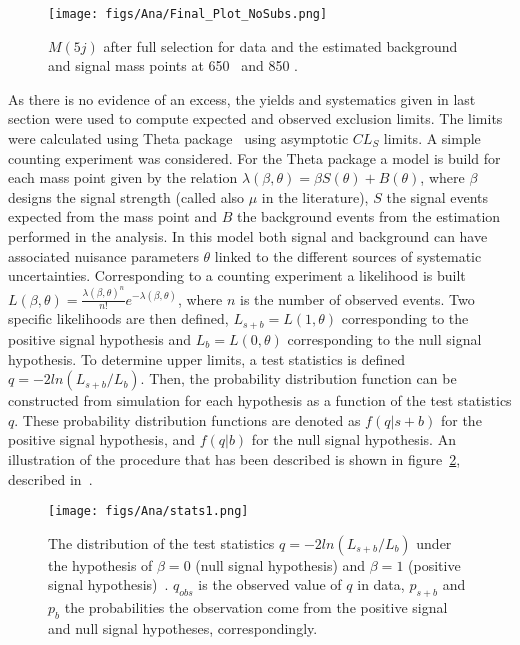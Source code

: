 \begin{figure}[!Hhtbp]
  \begin{center}
    \texttt{[image: figs/Ana/Final\_Plot\_NoSubs.png]}
    \caption{$M(5j)$ after full selection for data and the estimated background and signal mass points at 650 \GeVcc~and 850 \GeVcc.}
    \label{fig:FinalPlot2}
  \end{center}
\end{figure}

As there is no evidence of an excess, the yields and systematics given in last section were used to compute expected and observed exclusion limits. The limits were calculated using Theta package~\cite{theta_web} using asymptotic $CL_{S}$ limits. A simple counting experiment was considered. For the Theta package a model is build for each mass point given by the relation ${\lambda(\beta,\theta)=\beta S(\theta)+B(\theta)}$, where $\beta$ designs the signal strength (called also $\mu$ in the literature), $S$ the signal events expected from the mass point and $B$ the background events from the estimation performed in the analysis. In this model both signal and background can have associated nuisance parameters $\theta$ linked to the different sources of systematic uncertainties. Corresponding to a counting experiment a likelihood is built $L(\beta,\theta)=\frac{\lambda(\beta,\theta)^{n}}{n!}e^{-\lambda(\beta,\theta)}$, where $n$ is the number of observed events. Two specific likelihoods are then defined, $L_{s+b}=L(1,\theta)$ corresponding to the positive signal hypothesis and $L_{b}=L(0,\theta)$ corresponding to the null signal hypothesis. To determine upper limits, a test statistics is defined $q=-2ln(L_{s+b}/L_{b})$. Then, the probability distribution function can be constructed from simulation for each hypothesis as a function of the test statistics $q$. These probability distribution functions are denoted as $f(q|s+b)$ for the positive signal hypothesis, and $f(q|b)$ for the null signal hypothesis. An illustration of the procedure that has been described is shown in figure~\ref{fig:stats1}, described in~\cite{stats1}. 

\begin{figure}[!Hhtbp]
  \begin{center}
    \texttt{[image: figs/Ana/stats1.png]}
    \caption{The distribution of the test statistics $q=-2ln(L_{s+b}/L_{b})$ under the hypothesis of $\beta=0$ (null signal hypothesis) and $\beta=1$ (positive signal hypothesis)~\cite{stats1}. $q_{obs}$ is the observed value of $q$ in data, $p_{s+b}$ and $p_{b}$ the probabilities the observation come from the positive signal and null signal hypotheses, correspondingly.}
    \label{fig:stats1}
  \end{center}
\end{figure}

